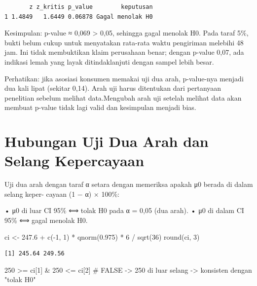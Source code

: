 \documentclass[
  indonesian,
  letterpaper,
]{book}
\newenvironment{Shaded}{\begin{snugshade}}{\end{snugshade}}
\newcommand{\CommentTok}[1]{\textcolor[rgb]{0.37,0.37,0.37}{#1}}
\newcommand{\DecValTok}[1]{\textcolor[rgb]{0.68,0.00,0.00}{#1}}
\newcommand{\FloatTok}[1]{\textcolor[rgb]{0.68,0.00,0.00}{#1}}
\newcommand{\FunctionTok}[1]{\textcolor[rgb]{0.28,0.35,0.67}{#1}}
\newcommand{\NormalTok}[1]{\textcolor[rgb]{0.00,0.23,0.31}{#1}}
\newcommand{\OtherTok}[1]{\textcolor[rgb]{0.00,0.23,0.31}{#1}}
\newcommand{\SpecialCharTok}[1]{\textcolor[rgb]{0.37,0.37,0.37}{#1}}
\begin{document}
\begin{verbatim}
       z z_kritis p_value        keputusan
1 1.4849   1.6449 0.06878 Gagal menolak H0
\end{verbatim}

Kesimpulan: p-value ≈ 0,069 \textgreater{} 0,05, sehingga gagal menolak
H0. Pada taraf 5\%, bukti belum cukup untuk menyatakan rata-rata waktu
pengiriman melebihi 48 jam. Ini tidak membuktikan klaim perusahaan
benar; dengan p-value 0,07, ada indikasi lemah yang layak
ditindaklanjuti dengan sampel lebih besar.

Perhatikan: jika asosiasi konsumen memakai uji dua arah, p-value-nya
menjadi dua kali lipat (sekitar 0,14). Arah uji harus ditentukan dari
pertanyaan penelitian sebelum melihat data.Mengubah arah uji setelah
melihat data akan membuat p-value tidak lagi valid dan kesimpulan
menjadi bias.

\section{Hubungan Uji Dua Arah dan Selang
Kepercayaan}\label{hubungan-uji-dua-arah-dan-selang-kepercayaan}

Uji dua arah dengan taraf α setara dengan memeriksa apakah μ0 berada di
dalam selang keper- cayaan (1 − α) × 100\%:

• μ0 di luar CI 95\% ⟺ tolak H0 pada α = 0,05 (dua arah). • μ0 di dalam
CI 95\% ⟺ gagal menolak H0.

\begin{Shaded}
\begin{Highlighting}[]
\NormalTok{ci }\OtherTok{\textless{}{-}} \FloatTok{247.6} \SpecialCharTok{+} \FunctionTok{c}\NormalTok{(}\SpecialCharTok{{-}}\DecValTok{1}\NormalTok{, }\DecValTok{1}\NormalTok{) }\SpecialCharTok{*} \FunctionTok{qnorm}\NormalTok{(}\FloatTok{0.975}\NormalTok{) }\SpecialCharTok{*} \DecValTok{6} \SpecialCharTok{/} \FunctionTok{sqrt}\NormalTok{(}\DecValTok{36}\NormalTok{)}
\FunctionTok{round}\NormalTok{(ci, }\DecValTok{3}\NormalTok{)}
\end{Highlighting}
\end{Shaded}

\begin{verbatim}
[1] 245.64 249.56
\end{verbatim}

\begin{Shaded}
\begin{Highlighting}[]
\DecValTok{250} \SpecialCharTok{\textgreater{}=}\NormalTok{ ci[}\DecValTok{1}\NormalTok{] }\SpecialCharTok{\&} \DecValTok{250} \SpecialCharTok{\textless{}=}\NormalTok{ ci[}\DecValTok{2}\NormalTok{] }\CommentTok{\# FALSE {-}\textgreater{} 250 di luar selang {-}\textgreater{} konsisten dengan "tolak H0"}
\end{Highlighting}
\end{Shaded}
\end{document}
